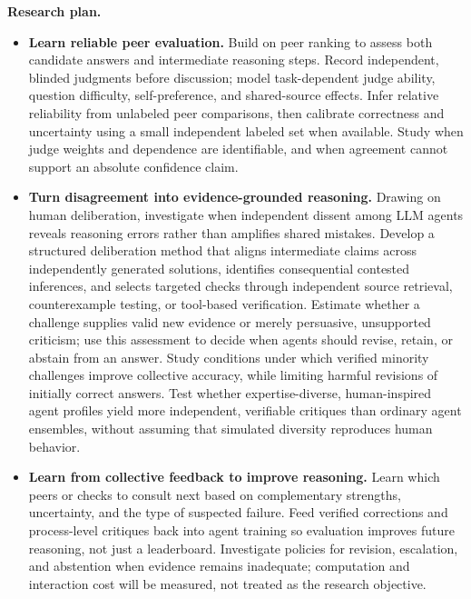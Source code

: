 \documentclass[10pt,letterpaper]{article}
\newcommand{\head}[1]{\textbf{#1}\enspace}
\begin{document}
\par\head{Research plan.}
\begin{itemize}
\item \textbf{Learn reliable peer evaluation.} Build on peer ranking to assess both candidate answers and intermediate reasoning steps. Record independent, blinded judgments before discussion; model task-dependent judge ability, question difficulty, self-preference, and shared-source effects. Infer relative reliability from unlabeled peer comparisons, then calibrate correctness and uncertainty using a small independent labeled set when available. Study when judge weights and dependence are identifiable, and when agreement cannot support an absolute confidence claim.
\item \textbf{Turn disagreement into evidence-grounded reasoning.} Drawing on human deliberation, investigate when independent dissent among LLM agents reveals reasoning errors rather than amplifies shared mistakes. Develop a structured deliberation method that aligns intermediate claims across independently generated solutions, identifies consequential contested inferences, and selects targeted checks through independent source retrieval, counterexample testing, or tool-based verification. Estimate whether a challenge supplies valid new evidence or merely persuasive, unsupported criticism; use this assessment to decide when agents should revise, retain, or abstain from an answer. Study conditions under which verified minority challenges improve collective accuracy, while limiting harmful revisions of initially correct answers. Test whether expertise-diverse, human-inspired agent profiles yield more independent, verifiable critiques than ordinary agent ensembles, without assuming that simulated diversity reproduces human behavior.
\item \textbf{Learn from collective feedback to improve reasoning.} Learn which peers or checks to consult next based on complementary strengths, uncertainty, and the type of suspected failure. Feed verified corrections and process-level critiques back into agent training so evaluation improves future reasoning, not just a leaderboard. Investigate policies for revision, escalation, and abstention when evidence remains inadequate; computation and interaction cost will be measured, not treated as the research objective.
\end{itemize}
\end{document}
